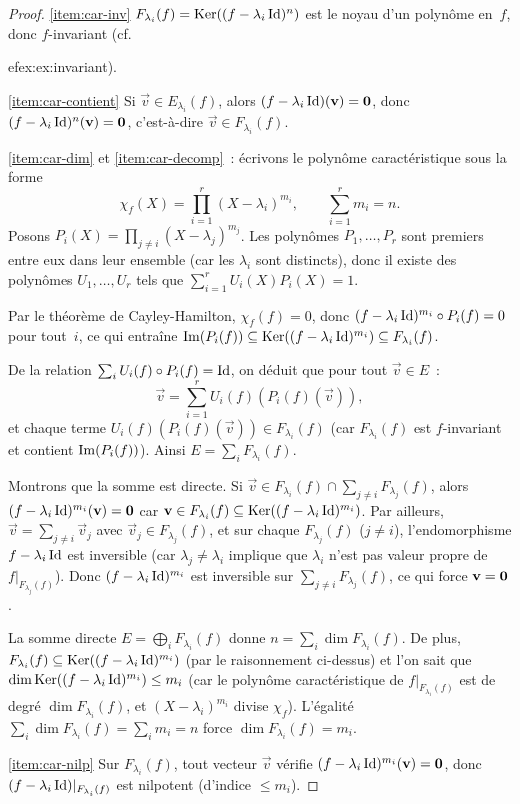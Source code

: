 \begin{proof}
  \ref{item:car-inv} $F_{\lambda_i}(f)=\operatorname{Ker}((f-\lambda_i\operatorname{Id})^n)$ est
  le noyau d'un polynôme en~$f$, donc $f$-invariant (cf.\
  
ef{ex:ex:invariant}).

  \ref{item:car-contient} Si $\vec{v}\in E_{\lambda_i}(f)$, alors
  $(f-\lambda_i\operatorname{Id})(\mathbf{v})=\mathbf{0}$, donc
  $(f-\lambda_i\operatorname{Id})^n(\mathbf{v})=\mathbf{0}$, c'est-à-dire
  $\vec{v}\in F_{\lambda_i}(f)$.

  \ref{item:car-dim} et \ref{item:car-decomp}~: écrivons le polynôme
  caractéristique sous la forme
  \[
    \chi_f(X)=\prod_{i=1}^{r}(X-\lambda_i)^{m_i},\qquad
    \sum_{i=1}^{r}m_i=n.
  \]
  Posons $P_i(X)=\prod_{j\neq i}(X-\lambda_j)^{m_j}$. Les polynômes
  $P_1,\ldots,P_r$ sont premiers entre eux dans leur ensemble (car les
  $\lambda_i$ sont distincts), donc il existe des polynômes
  $U_1,\ldots,U_r$ tels que
  $\sum_{i=1}^{r}U_i(X)P_i(X)=1$.

  Par le théorème de Cayley-Hamilton, $\chi_f(f)=0$, donc
  $(f-\lambda_i\operatorname{Id})^{m_i}\circ P_i(f)=0$ pour tout~$i$, ce qui
  entraîne $\operatorname{Im}(P_i(f))\subseteq\operatorname{Ker}((f-\lambda_i\operatorname{Id})^{m_i})\subseteq
  F_{\lambda_i}(f)$.

  De la relation $\sum_i U_i(f)\circ P_i(f)=\operatorname{Id}$, on déduit que pour
  tout $\vec{v}\in E$~:
  \[
    \vec{v}=\sum_{i=1}^{r}U_i(f)(P_i(f)(\vec{v})),
  \]
  et chaque terme $U_i(f)(P_i(f)(\vec{v}))\in F_{\lambda_i}(f)$ (car
  $F_{\lambda_i}(f)$ est $f$-invariant et contient $\operatorname{Im}(P_i(f))$).
  Ainsi $E=\sum_i F_{\lambda_i}(f)$.

  Montrons que la somme est directe. Si
  $\vec{v}\in F_{\lambda_i}(f)\cap\sum_{j\neq i}F_{\lambda_j}(f)$,
  alors $(f-\lambda_i\operatorname{Id})^{m_i}(\mathbf{v})=\mathbf{0}$ car
  $\mathbf{v}\in F_{\lambda_i}(f)\subseteq\operatorname{Ker}((f-\lambda_i\operatorname{Id})^{m_i})$.
  Par ailleurs, $\vec{v}=\sum_{j\neq i}\vec{v}_j$ avec
  $\vec{v}_j\in F_{\lambda_j}(f)$, et sur chaque $F_{\lambda_j}(f)$
  ($j\neq i$), l'endomorphisme $f-\lambda_i\operatorname{Id}$ est inversible
  (car $\lambda_j\neq\lambda_i$ implique que $\lambda_i$ n'est pas
  valeur propre de $f|_{F_{\lambda_j}(f)}$). Donc
  $(f-\lambda_i\operatorname{Id})^{m_i}$ est inversible sur
  $\sum_{j\neq i}F_{\lambda_j}(f)$, ce qui force $\mathbf{v}=\mathbf{0}$.

  La somme directe $E=\bigoplus_i F_{\lambda_i}(f)$ donne
  $n=\sum_i\dim F_{\lambda_i}(f)$. De plus,
  $F_{\lambda_i}(f)\subseteq\operatorname{Ker}((f-\lambda_i\operatorname{Id})^{m_i})$ (par le
  raisonnement ci-dessus) et l'on sait que
  $\dim\operatorname{Ker}((f-\lambda_i\operatorname{Id})^{m_i})\leq m_i$ (car le polynôme
  caractéristique de $f|_{F_{\lambda_i}(f)}$ est de degré
  $\dim F_{\lambda_i}(f)$, et $(X-\lambda_i)^{m_i}$ divise $\chi_f$).
  L'égalité $\sum_i\dim F_{\lambda_i}(f)=\sum_i m_i=n$ force
  $\dim F_{\lambda_i}(f)=m_i$.

  \ref{item:car-nilp} Sur $F_{\lambda_i}(f)$, tout vecteur
  $\vec{v}$ vérifie $(f-\lambda_i\operatorname{Id})^{m_i}(\mathbf{v})=\mathbf{0}$, donc
  $(f-\lambda_i\operatorname{Id})|_{F_{\lambda_i}(f)}$ est nilpotent (d'indice
  $\leq m_i$).
\end{proof}


